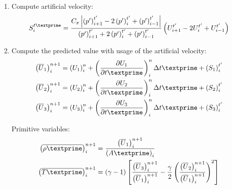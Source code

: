 \documentclass[12pt]{article}
\begin{document}
\begin{enumerate}
\begin{enumerate}
\begin{enumerate}
			\item Compute artificial velocity:
				\begin{equation}
					S^{t\textprime}_{i} = \frac{C_x\left|\left(p'\right)^{t'}_{i+1} - 2\left(p'\right)^{t'}_{i} + \left(p'\right)^{t'}_{i-1}\right|}{\left(p'\right)^{t'}_{i+1} + 2\left(p'\right)^{t'}_{i} + \left(p'\right)^{t'}_{i-1}}\left(U^{t'}_{i+1} - 2U^{t'}_{i} + U^{t'}_{i-1}\right)
				\end{equation}
			\item Compute the predicted value with usage of the artificial velocity:
				\begin{align}
					\left(\overline{U}_{1}\right)_{i}^{n+1} &= \left(U_{1}\right)_{i}^{n} + \left(\frac{\partial U_{1}}{\partial t\textprime}\right)_{i}^{n}\Delta t\textprime + \left(S_1\right)^{t'}_{i}\\
					\left(\overline{U}_{2}\right)_{i}^{n+1} &= \left(U_{2}\right)_{i}^{n} + \left(\frac{\partial U_{2}}{\partial t\textprime}\right)_{i}^{n}\Delta t\textprime + \left(S_2\right)^{t'}_{i}\\
					\left(\overline{U}_{3}\right)_{i}^{n+1} &= \left(U_{3}\right)_{i}^{n} + \left(\frac{\partial U_{3}}{\partial t\textprime}\right)_{i}^{n}\Delta t\textprime + \left(S_3\right)^{t'}_{i}
				\end{align}
				\par Primitive variables:
				\begin{align}
					\left(\overline{\rho\textprime}\right)_{i}^{n+1} &= \frac{\left(\overline{U}_{1}\right)_{i}^{n+1}}{\left(A\textprime\right)_{i}} \\
					\left(\overline{T\textprime}\right)_{i}^{n+1} &= \left(\gamma - 1\right)\left[\frac{\left(\overline{U}_3\right)_{i}^{n+1}}{\left(\overline{U}_1\right)_{i}^{n+1}} - \frac{\gamma}{2}\left(\frac{\left(\overline{U}_2\right)_{i}^{n+1}}{\left(\overline{U}_1\right)_{i}^{n+1}}\right)^2\right]
				\end{align}


\end{enumerate}
\end{enumerate}
\end{enumerate}
\end{document}
